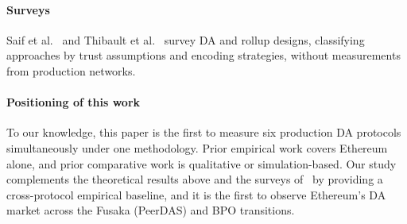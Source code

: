 \paragraph{Surveys}
Saif et al.~\cite{Saif_Survey_DA_Rollups} and Thibault et al.~\cite{Thibault2022Rollups} survey DA and rollup designs, classifying approaches by trust assumptions and encoding strategies, without measurements from production networks.

\paragraph{Positioning of this work}
To our knowledge, this paper is the first to measure six production DA protocols simultaneously under one methodology.
Prior empirical work covers Ethereum alone, and prior comparative work is qualitative or simulation-based.
Our study complements the theoretical results above and the surveys of~\cite{Saif_Survey_DA_Rollups, Thibault2022Rollups} by providing a cross-protocol empirical baseline, and it is the first to observe Ethereum's DA market across the Fusaka (PeerDAS) and BPO transitions.
